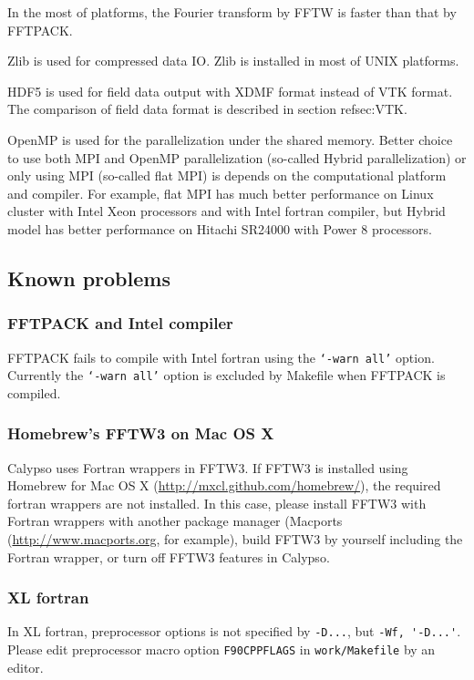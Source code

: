In the most of platforms, the Fourier transform by FFTW is faster than that by FFTPACK. 

Zlib is used for compressed data IO. Zlib is installed in most of UNIX platforms.

HDF5 is used for field data output with XDMF format instead of VTK format. The comparison of field data format is described in section ref{sec:VTK}. 

OpenMP is used for the parallelization under the shared memory. Better choice to use both MPI and OpenMP parallelization (so-called Hybrid parallelization) or only using MPI (so-called flat MPI) is depends on the computational platform and compiler. For example, flat MPI has much better performance on Linux cluster with Intel Xeon processors and with Intel fortran compiler, but Hybrid model has better performance on Hitachi SR24000 with Power 8 processors.

\subsection{Known problems}
\subsubsection*{FFTPACK and Intel compiler}
FFTPACK fails to compile with Intel fortran using the {\tt `-warn all'} option. Currently the {\tt `-warn all'} option is excluded by Makefile when FFTPACK is compiled.

\subsubsection*{Homebrew's FFTW3 on Mac OS X}
Calypso uses Fortran wrappers in FFTW3. If FFTW3 is installed using Homebrew for Mac OS X (\url{http://mxcl.github.com/homebrew/}), the required fortran wrappers are not installed. In this case, please install FFTW3 with Fortran wrappers with another package manager (Macports (\url{http://www.macports.org}, for example), build FFTW3 by yourself including the Fortran wrapper, or turn off FFTW3 features in Calypso.

\subsubsection*{XL fortran}
In XL fortran, preprocessor options is not specified by \verb|-D...|, but \verb|-Wf, '-D...'|. Please edit preprocessor macro option \verb|F90CPPFLAGS| in \verb|work/Makefile| by an editor.

